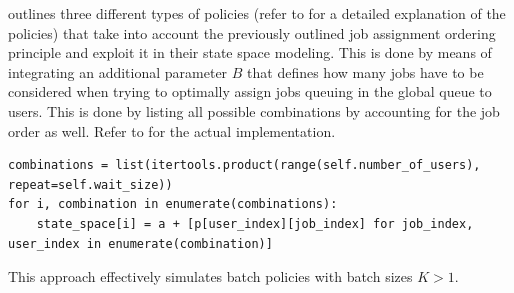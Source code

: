  outlines three different types of policies (refer to  for a detailed explanation of the policies) that take into account the previously outlined job assignment ordering principle and exploit it in their state space modeling. This is done by means of integrating an additional parameter $B$ that defines how many jobs have to be considered when trying to optimally assign jobs queuing in the global queue to users. This is done by listing all possible combinations by accounting for the job order as well. Refer to  for the actual implementation.

\begin{lstlisting}[caption=State space modeling by considering $B$ jobs from the global queue and integrating all possible combinations.,label=lst:wz_combinations,style=CustomPython]
combinations = list(itertools.product(range(self.number_of_users), repeat=self.wait_size))
for i, combination in enumerate(combinations):
    state_space[i] = a + [p[user_index][job_index] for job_index, user_index in enumerate(combination)]
\end{lstlisting}

This approach effectively simulates batch policies with batch sizes $K>1$.